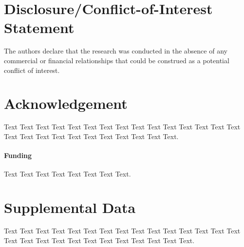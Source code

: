 \documentclass{frontiersSCNS} %
\begin{document}
\section*{Disclosure/Conflict-of-Interest Statement}
The authors declare that the research was conducted in the absence of any
commercial or financial relationships that could be construed as a potential
conflict of interest.

\section*{Acknowledgement} Text Text Text Text Text Text  Text Text Text Text
Text Text Text Text  Text Text Text Text Text Text Text Text Text  Text Text
Text.

\paragraph{Funding\textcolon} Text Text Text Text Text Text  Text Text.

\section*{Supplemental Data} Text Text Text Text Text Text  Text Text Text Text
Text Text Text Text Text  Text Text Text Text Text Text Text Text Text  Text
Text Text.


\end{document}
